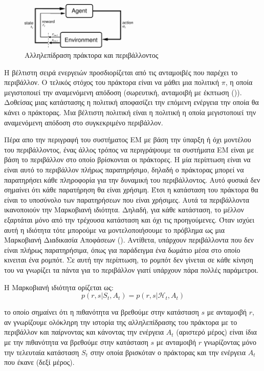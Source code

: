 \begin{figure}[ht]
    \includegraphics[width=0.5\textwidth]{body_matter/reinforcement_learning/images/agent_environment.png}
    \Centering
    \caption{Αλληλεπίδραση πράκτορα και περιβάλλοντος}
    \label{fig:agent_environment}
\end{figure}


Η βέλτιστη σειρά ενεργειών προσδιορίζεται από τις ανταμοιβές που παρέχει το περιβάλλον. Ο τελικός στόχος του πράκτορα είναι να μάθει μια
πολιτική $π$, η οποία μεγιστοποιεί την αναμενόμενη απόδοση (σωρευτική, ανταμοιβή με έκπτωση ()). Δοθείσας μιας κατάστασης
η πολιτική αποφασίζει την επόμενη ενέργεια την οποία θα κάνει ο πράκτορας. Μια βέλτιστη πολιτική είναι η πολιτική η οποία μεγιστοποιεί
την αναμενόμενη απόδοση στο συγκεκριμένο περιβάλλον.

Πέρα απο την περιγραφή του συστήματος ΕΜ με βάση την ύπαρξη ή όχι μοντέλου του περιβάλλοντος, ένας
άλλος τρόπος να περιγράψουμε τα συστήματα ΕΜ είναι με βάση το περιβάλλον στο οποίο βρίσκονται οι πράκτορες. Η μία περίπτωση είναι να είναι αυτό το περιβάλλον πλήρως παρατηρήσιμο, δηλαδή ο πράκτορας μπορεί να παρατηρήσει κάθε πληροφορία για την δυναμική του περιβάλλοντος.
Αυτό φυσικά δεν σημαίνει ότι κάθε παρατήρηση θα είναι χρήσιμη. Έτσι η κατάσταση
του πράκτορα θα είναι το υποσύνολο των παρατηρήσεων που είναι χρήσιμες. Αυτά τα
περιβάλλοντα ικανοποιούν την Μαρκοβιανή ιδιότητα. Δηλαδή, για κάθε κατάσταση, το μέλλον εξαρτάται μόνο από
την τρέχουσα κατάσταση και όχι τις προηγούμενες. Όταν ισχύει αυτή η ιδιότητα τότε μπορούμε να μοντελοποιήσουμε το πρόβλημα ως μια
Μαρκοβιανή Διαδικασία Αποφάσεων (). Αντίθετα, υπάρχουν περιβάλλοντα που δεν είναι πλήρως
παρατηρήσιμα, όπως για παράδειγμα ένα δωμάτιο μέσα στο οποίο κινειται ένα ρομπότ. Σε αυτή την περίπτωση,
το ρομπότ δεν γίνεται σε κάθε κίνηση του να γνωρίζει τα πάντα για το περιβάλλον γιατί υπάρχουν πάρα πολλές παράμετροι.

Η Μαρκοβιανή ιδιότητα ορίζεται ως:
\begin{equation}
    p(r,s|S_t, A_t) = p(r,s | \mathcal{H}_t, A_t)
\end{equation}

το οποίο σημαίνει ότι η πιθανότητα να βρεθούμε στην κατάσταση $s$ με ανταμοιβή $r$, αν γνωρίζουμε
ολόκληρη την ιστορία της αλληλεπίδρασης του πράκτορα με το περιβάλλον και παίρνοντας και κάνοντας
την ενέργεια $A_t$ (αριστερό μέρος) είναι ίδια με την πιθανότητα να βρεθούμε στην κατάσταση $s$ με
ανταμοιβή $r$ γνωρίζοντας μόνο την τελευταία κατάσταση $S_t$ στην οποία βρισκόταν ο πράκτορας
και την ενέργεια $A_t$ που έκανε (δεξί μέρος).

